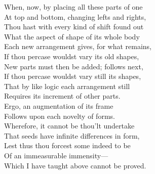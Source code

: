 When, now, by placing all these parts of one\\
At top and bottom, changing lefts and rights,\\
Thou hast with every kind of shift found out\\
What the aspect of shape of its whole body\\
Each new arrangement gives, for what remains,\\
If thou percase wouldst vary its old shapes,\\
New parts must then be added; follows next,\\
If thou percase wouldst vary still its shapes,\\
That by like logic each arrangement still\\
Requires its increment of other parts.\\
Ergo, an augmentation of its frame\\
Follows upon each novelty of forms.\\
Wherefore, it cannot be thou'lt undertake\\
That seeds have infinite differences in form,\\
Lest thus thou forcest some indeed to be\\
Of an immeasurable immensity—\\
Which I have taught above cannot be proved.

